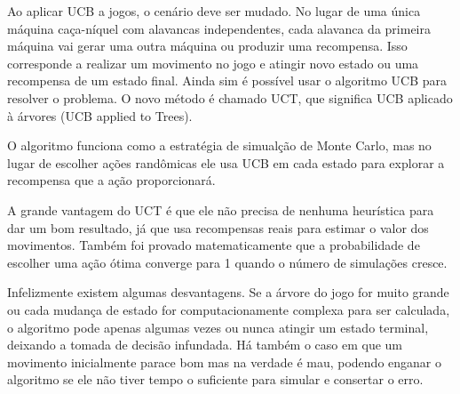 Ao aplicar UCB a jogos, o cenário deve ser mudado. No lugar de uma única máquina caça-níquel com alavancas independentes, cada alavanca da primeira máquina vai gerar uma outra máquina ou produzir uma recompensa. Isso corresponde a realizar um movimento no jogo e atingir novo estado ou uma recompensa de um estado final. Ainda sim é possível usar o algoritmo UCB para resolver o problema. O novo método é chamado UCT\cite{uct}, que significa UCB aplicado à árvores (UCB applied to Trees). 

O algoritmo funciona como a estratégia de simualção de Monte Carlo, mas no lugar de escolher ações randômicas ele usa UCB em cada estado para explorar a recompensa que a ação proporcionará. 

A grande vantagem do UCT é que ele não precisa de nenhuma heurística para dar um bom resultado, já que usa recompensas reais para estimar o valor dos movimentos. Também foi provado matematicamente que a probabilidade de escolher uma ação ótima converge para 1 quando o número de simulações cresce. 

Infelizmente existem algumas desvantagens. Se a árvore do jogo for muito grande ou cada mudança de estado for computacionamente complexa para ser calculada, o algoritmo pode apenas algumas vezes ou nunca atingir um estado terminal, deixando a tomada de decisão infundada. Há também o caso em que um movimento inicialmente parace bom mas na verdade é mau, podendo enganar o algoritmo se ele não tiver tempo o suficiente para simular e consertar o erro. 